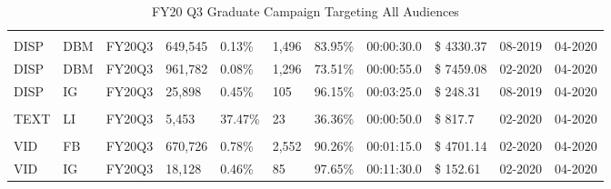 \documentclass[
  11pt,
]{article}
\begin{document}
\begin{landscape}\begin{table}

\caption{\label{tab:unnamed-chunk-4}FY20 Q3 Graduate Campaign Targeting All Audiences}
\centering
\begin{tabu} to 
\toprule
{} &  &  &  &  &  &  &  &  &  & \\
\midrule
\addlinespace[0.3em]
\\
\hspace{1em}DISP & DBM & FY20Q3 & 649,545 & 0.13\% & 1,496 & 83.95\% & 00:00:30.0 & \$ 4330.37 & 08-2019 & 04-2020\\
\hspace{1em}DISP & DBM & FY20Q3 & 961,782 & 0.08\% & 1,296 & 73.51\% & 00:00:55.0 & \$ 7459.08 & 02-2020 & 04-2020\\
\hspace{1em}DISP & IG & FY20Q3 & 25,898 & 0.45\% & 105 & 96.15\% & 00:03:25.0 & \$ 248.31 & 08-2019 & 04-2020\\
\addlinespace[0.3em]
\\
\hspace{1em}TEXT & LI & FY20Q3 & 5,453 & 37.47\% & 23 & 36.36\% & 00:00:50.0 & \$ 817.7 & 02-2020 & 04-2020\\
\addlinespace[0.3em]
\\
\hspace{1em}VID & FB & FY20Q3 & 670,726 & 0.78\% & 2,552 & 90.26\% & 00:01:15.0 & \$ 4701.14 & 02-2020 & 04-2020\\
\hspace{1em}VID & IG & FY20Q3 & 18,128 & 0.46\% & 85 & 97.65\% & 00:11:30.0 & \$ 152.61 & 02-2020 & 04-2020\\
\bottomrule
\end{tabu}
\end{table}
\end{landscape}
\end{document}
